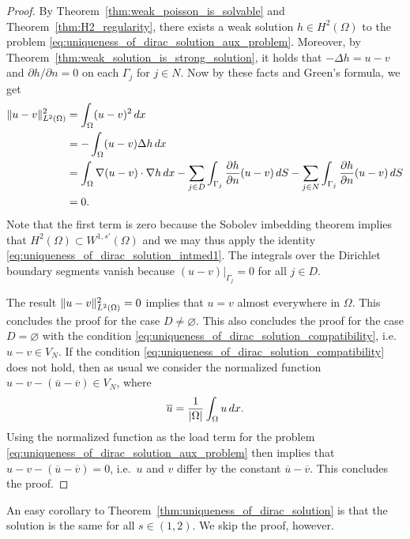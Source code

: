 \documentclass[english, 12pt, a4paper, sci, utf8, a-2b, online]{aaltothesis}
\theoremstyle{definition}
\theoremstyle{plain}
\DeclarePairedDelimiter\abs{\lvert}{\rvert}
\DeclarePairedDelimiter\norm{\lVert}{\rVert}
\newcommand*\diff{\mathop{}\!d}
\numberwithin{equation}{section}
\begin{document}
\begin{proof}
    By Theorem~\ref{thm:weak_poisson_is_solvable}
    and Theorem~\ref{thm:H2_regularity}, there exists a weak solution
    $h \in H^2(\Omega)$ to the problem 
    \eqref{eq:uniqueness_of_dirac_solution_aux_problem}.
    Moreover, by Theorem~\ref{thm:weak_solution_is_strong_solution},
    it holds that $-\Delta h = u-v$
    and $\partial h / \partial n = 0$ on each $\Gamma_j$ for $j \in N$.
    Now by these facts and Green's formula, we get
    \begin{align*}
        \norm{u-v}_{L^2(\Omega)}^2
        &= \int_{\Omega} (u-v)^2 \diff x \\
        &= - \int_{\Omega} (u-v) \Delta h  \diff x \\
        &= \int_{\Omega} \nabla (u-v) \cdot \nabla h \diff x
            - \sum_{j \in D} \int_{\Gamma_j}
                \frac{\partial h}{\partial n} (u-v) \diff S
            - \sum_{j \in N} \int_{\Gamma_j}
                \frac{\partial h}{\partial n} (u-v) \diff S \\
        &= 0.
    \end{align*}
    Note that the first term is zero because the Sobolev imbedding theorem
    implies that $H^2(\Omega) \subset W^{1,s'}(\Omega)$ and we may thus
    apply the identity \eqref{eq:uniqueness_of_dirac_solution_intmed1}.
    The integrals over the Dirichlet boundary segments vanish because
    $(u-v)|_{\Gamma_j} = 0$ for all $j \in D$.
    
    The result $\norm{u-v}_{L^2(\Omega)}^2 = 0$ implies that $u = v$
    almost everywhere in $\Omega$. This concludes the proof for the
    case $D \neq \varnothing$. This also concludes the proof for the case
    $D = \varnothing$ with the condition 
    \eqref{eq:uniqueness_of_dirac_solution_compatibility}, i.e.\
    $u-v \in V_N$. If the condition 
    \eqref{eq:uniqueness_of_dirac_solution_compatibility} does not hold,
    then as usual we consider the normalized function
    $u-v-(\overline{u} - \overline{v}) \in V_N$, where
    \begin{equation*}
        \overline{u} = \frac{1}{\abs{\Omega}} \int_{\Omega} u \diff x.
    \end{equation*}
    Using the normalized function as the load term for the problem
    \eqref{eq:uniqueness_of_dirac_solution_aux_problem} then
    implies that $u-v-(\overline{u} - \overline{v}) = 0$,
    i.e.\ $u$ and $v$ differ by the constant $\overline{u} - \overline{v}$.
    This concludes the proof.
\end{proof}

An easy corollary to Theorem~\ref{thm:uniqueness_of_dirac_solution}
is that the solution is the same for all $s \in (1,2)$.
We skip the proof, however.
\end{document}
